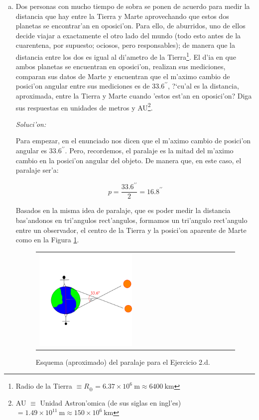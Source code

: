 \documentclass{article}
\begin{document}
\begin{enumerate} [a)]
\item Dos personas con mucho tiempo de sobra se ponen de acuerdo para medir la distancia que hay entre la Tierra y Marte aprovechando que estos dos planetas se encontrar'an en oposici'on. Para ello, de aburridos, uno de ellos decide viajar a exactamente el otro lado del mundo (todo esto antes de la cuarentena, por supuesto; ociosos, pero responsables); de manera que la distancia entre los dos es igual al di'ametro de la Tierra\footnote{Radio de la Tierra $\equiv R_{\oplus} = 6.37 \times 10^{6} \ \text{m} \approx 6400 \ \text{km}$ }. El d'ia en que ambos planetas se encuentran en oposici'on, realizan sus mediciones, comparan sus datos de Marte y encuentran que el m'aximo cambio de posici'on angular entre sus mediciones es de $33.6^{\prime \prime}$, ?`cu'al es la distancia, aproximada, entre la Tierra y Marte cuando 'estos est'an en oposici'on? Diga sus respuestas en unidades de metros y AU\footnote{AU $\equiv$ Unidad Astron'omica (de sus siglas en ingl'es) $ = 1.49 \times 10^{11} \ \text{m} \approx 150 \times 10^{6} \ \text{km}$}.

\vspace{2mm}

\textit{Soluci'on:}

\vspace{2mm}

Para empezar, en el enunciado nos dicen que el m'aximo cambio de posici'on angular es $33.6^{\prime \prime}$. Pero, recordemos, el paralaje es la mitad del m'aximo cambio en la posici'on angular del objeto. De manera que, en este caso, el paralaje ser'a:

\begin{equation*}
p = \frac{33.6^{\prime \prime}}{2} = 16.8^{\prime \prime}
\end{equation*}

Basados en la misma idea de paralaje, que es poder medir la distancia bas'andonos en tri'angulos rect'angulos, formamos un tri'angulo rect'angulo entre un observador, el centro de la Tierra y la posici'on aparente de Marte como en la Figura \ref{fig3}.

\begin{figure}[!ht]
\begin{center}
\begin{tabular}{ll}
  \includegraphics[width=0.5\textwidth]{ejercicio_marte.png} 
\end{tabular}
\caption{{\small Esquema (aproximado) del paralaje para el Ejercicio 2.d.}}\label{fig3}
\end{center} 
\end{figure}


\end{enumerate}
\end{document}
